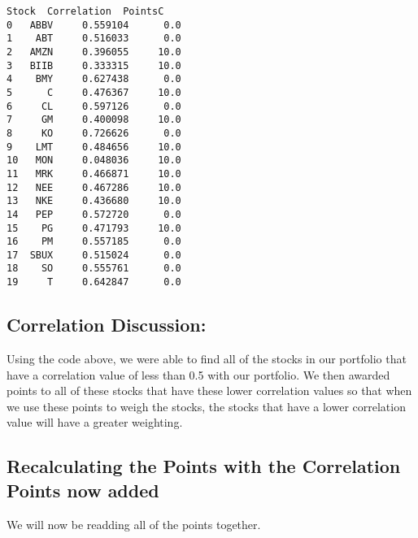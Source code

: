 \documentclass[11pt]{article}
\makeatletter
\newcommand{\boxspacing}{\kern\kvtcb@left@rule\kern\kvtcb@boxsep}
\newcommand{\prompt}[4]{
        {\ttfamily\llap{{\color{#2}[#3]:\hspace{3pt}#4}}\vspace{-\baselineskip}}
    }
\makeatother
\begin{document}
            \begin{tcolorbox}[breakable, size=fbox, boxrule=.5pt, pad at break*=1mm, opacityfill=0]
\prompt{Out}{outcolor}{34}{\boxspacing}
\begin{Verbatim}[commandchars=\\\{\}]
   Stock  Correlation  PointsC
0   ABBV     0.559104      0.0
1    ABT     0.516033      0.0
2   AMZN     0.396055     10.0
3   BIIB     0.333315     10.0
4    BMY     0.627438      0.0
5      C     0.476367     10.0
6     CL     0.597126      0.0
7     GM     0.400098     10.0
8     KO     0.726626      0.0
9    LMT     0.484656     10.0
10   MON     0.048036     10.0
11   MRK     0.466871     10.0
12   NEE     0.467286     10.0
13   NKE     0.436680     10.0
14   PEP     0.572720      0.0
15    PG     0.471793     10.0
16    PM     0.557185      0.0
17  SBUX     0.515024      0.0
18    SO     0.555761      0.0
19     T     0.642847      0.0
\end{Verbatim}
\end{tcolorbox}
        
    \hypertarget{correlation-discussion}{%
\subsection{Correlation Discussion:}\label{correlation-discussion}}

Using the code above, we were able to find all of the stocks in our
portfolio that have a correlation value of less than 0.5 with our
portfolio. We then awarded points to all of these stocks that have these
lower correlation values so that when we use these points to weigh the
stocks, the stocks that have a lower correlation value will have a
greater weighting.

    \hypertarget{recalculating-the-points-with-the-correlation-points-now-added}{%
\subsection{Recalculating the Points with the Correlation Points now
added}\label{recalculating-the-points-with-the-correlation-points-now-added}}

    We will now be readding all of the points together.
\end{document}

